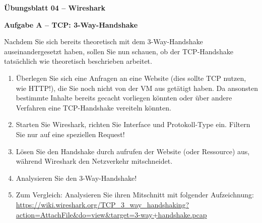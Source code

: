 \documentclass[paper=a4,fontsize=11pt]{scrartcl}%
\begin{document}
\begin{center}
\Large{\textbf{Übungsblatt 04 -- Wireshark}}\\
\end{center}

\begin{center}\Large{\textbf{Aufgabe A -- TCP: 3-Way-Handshake}}\end{center}\vskip0.2in
Nachdem Sie sich bereits theoretisch mit dem 3-Way-Handshake auseinandergesetzt haben, sollen Sie nun schauen, ob der TCP-Handshake tatsächlich wie theoretisch beschrieben arbeitet.
\begin{enumerate}
	\item Überlegen Sie sich eine Anfragen an eine Website (dies sollte TCP nutzen, wie HTTP!), die Sie noch nicht von der VM aus getätigt haben. Da ansonsten bestimmte Inhalte bereits gecacht vorliegen könnten oder über andere Verfahren eine TCP-Handshake vereiteln könnten.
	\item Starten Sie Wireshark, richten Sie Interface und Protokoll-Type ein. Filtern Sie nur auf eine speziellen Request!
	\item Lösen Sie den Handshake durch aufrufen der Website (oder Ressource) aus, während Wireshark den Netzverkehr mitschneidet.
	\item Analysieren Sie den 3-Way-Handshake!
	\item Zum Vergleich: Analysieren Sie ihren Mitschnitt mit folgender Aufzeichnung: \url{https://wiki.wireshark.org/TCP_3_way_handshaking?action=AttachFile&do=view&target=3-way+handshake.pcap}
\end{enumerate}
\end{document}
